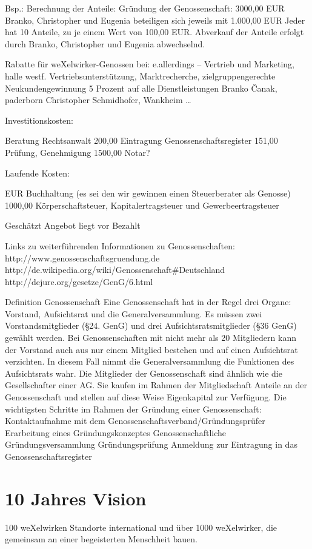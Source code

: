 Bsp.: Berechnung der Anteile:
Gründung der Genossenschaft: 3000,00 EUR
Branko, Christopher und Eugenia beteiligen sich jeweils mit 1.000,00 EUR
Jeder hat 10 Anteile, zu je einem Wert von 100,00 EUR.
Abverkauf der Anteile erfolgt durch Branko, Christopher und Eugenia abwechselnd.


Rabatte für weXelwirker-Genossen bei:
e.allerdings – Vertrieb und Marketing, halle westf.
Vertriebsunterstützung, Marktrecherche, zielgruppengerechte Neukundengewinnung
5 Prozent auf alle Dienstleistungen
Branko Čanak, paderborn
Christopher Schmidhofer, Wankheim
…


 
Investitionskosten:

Beratung Rechtsanwalt
200,00
Eintragung Genossenschaftsregister
151,00
Prüfung, Genehmigung
1500,00
Notar?









Laufende Kosten:

EUR
Buchhaltung (es sei den wir gewinnen einen Steuerberater als Genosse)
1000,00
Körperschaftsteuer, Kapitalertragsteuer und Gewerbeertragsteuer










Geschätzt
Angebot liegt vor
Bezahlt


Links zu weiterführenden Informationen zu Genossenschaften:
http://www.genossenschaftsgruendung.de
http://de.wikipedia.org/wiki/Genossenschaft\#Deutschland
http://dejure.org/gesetze/GenG/6.html

Definition Genossenschaft
Eine Genossenschaft hat in der Regel drei Organe: Vorstand, Aufsichtsrat und die Generalversammlung. Es müssen zwei Vorstandsmitglieder (\S 24. GenG) und drei Aufsichtsratsmitglieder (\S 36 GenG) gewählt werden. Bei Genossenschaften mit nicht mehr als 20 Mitgliedern kann der Vorstand auch aus nur einem Mitglied bestehen und auf einen Aufsichtsrat verzichten. In diesem Fall nimmt die Generalversammlung die Funktionen des Aufsichtsrats wahr.
Die Mitglieder der Genossenschaft sind ähnlich wie die Gesellschafter einer AG. Sie kaufen im Rahmen der Mitgliedschaft Anteile an der Genossenschaft und stellen auf diese Weise Eigenkapital zur Verfügung.
Die wichtigsten Schritte im Rahmen der Gründung einer Genossenschaft:
Kontaktaufnahme mit dem Genossenschaftsverband/Gründungsprüfer
Erarbeitung eines Gründungskonzeptes
Genossenschaftliche Gründungsversammlung
Gründungsprüfung
Anmeldung zur Eintragung in das Genossenschaftsregister

  \section{10 Jahres Vision}
100 weXelwirken Standorte international und über 1000 weXelwirker, die gemeinsam an einer begeisterten Menschheit bauen.
